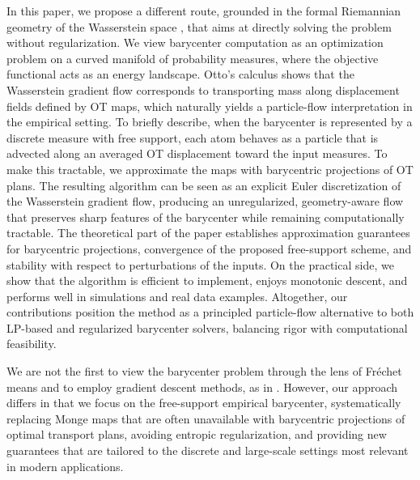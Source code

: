 \documentclass[11pt]{article}
\newcommand{\Frechet}{Fr\'{e}chet\xspace}
\begin{document}
In this paper, we propose a different route, grounded in the formal Riemannian geometry of the Wasserstein space \citep{otto_2001_GeometryDissipativeEvolution}, that aims at directly solving the problem without regularization. We view barycenter computation as an optimization problem on a curved manifold of probability measures, where the objective functional acts as an energy landscape. Otto's calculus shows that the Wasserstein gradient flow corresponds to transporting mass along displacement fields defined by OT maps, which naturally yields a particle-flow interpretation in the empirical setting. To briefly describe, when the barycenter is represented by a discrete measure with free support, each atom behaves as a particle that is advected along an averaged OT displacement toward the input measures. To make this tractable, we approximate the maps with barycentric projections of OT plans. The resulting algorithm can be seen as an explicit Euler discretization of the Wasserstein gradient flow, producing an unregularized, geometry-aware flow that preserves sharp features of the barycenter while remaining computationally tractable. The theoretical part of the paper establishes approximation guarantees for barycentric projections, convergence of the proposed free-support scheme, and stability with respect to perturbations of the inputs. On the practical side, we show that the algorithm is efficient to implement, enjoys monotonic descent, and performs well in simulations and real data examples. Altogether, our contributions position the method as a principled particle-flow alternative to both LP-based and regularized barycenter solvers, balancing rigor with computational feasibility.  

We are not the first to view the barycenter problem through the lens of \Frechet means and to employ gradient descent methods, as in \citet{zemel_2019_FrechetMeansProcrustes}. However, our approach differs in that we focus on the free-support empirical barycenter, systematically replacing Monge maps that are often unavailable with barycentric projections of optimal transport plans, avoiding entropic regularization, and providing new guarantees that are tailored to the discrete and large-scale settings most relevant in modern applications.
\end{document}
